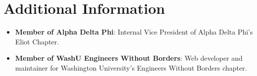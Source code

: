 \documentclass[letterpaper,11pt]{article}
\newcommand{\resumeItemSmall}[2]{
	\item[]
	\small{
		\textbf{#1}{: #2 \vspace{-2pt}}
	}
}
\newcommand{\resumeSubItemSmall}[2]{\resumeItemSmall{#1}{#2}\vspace{-4pt}}
\newcommand{\resumeSubHeadingListStart}{\begin{itemize}[leftmargin=*]}
\newcommand{\resumeSubHeadingListEnd}{\end{itemize}}
\begin{document}
\section{Additional Information}
	\resumeSubHeadingListStart
		\resumeSubItemSmall{Member of Alpha Delta Phi}
		{Internal Vice President of Alpha Delta Phi's Eliot Chapter.}
		\resumeSubItemSmall{Member of WashU Engineers Without Borders}{Web developer and maintainer for Washington University's Engineers Without Borders chapter.}
	\resumeSubHeadingListEnd
\end{document}
